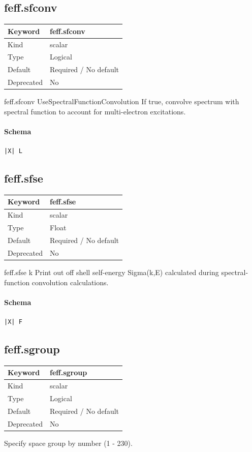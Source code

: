 \documentclass[11pt]{article}
\begin{document}
{{{{\subsection{feff.sfconv}
\label{kw:feff-sfconv}
\begin{longtable}{|p{1.5in}|p{4.5in}|}
\hline
Keyword & feff.sfconv \\
\hline
Kind & scalar \\
\hline
Type & Logical \\
\hline
Default & Required / No default \\
\hline
Deprecated & No \\
\hline
\end{longtable}
 feff.sfconv{ UseSpectralFunctionConvolution }
 If true, convolve spectrum with spectral function to account for
 multi-electron excitations.

\paragraph{Schema}
\begin{Verbatim}
|X| L
\end{Verbatim}

\subsection{feff.sfse}
\label{kw:feff-sfse}
\begin{longtable}{|p{1.5in}|p{4.5in}|}
\hline
Keyword & feff.sfse \\
\hline
Kind & scalar \\
\hline
Type & Float \\
\hline
Default & Required / No default \\
\hline
Deprecated & No \\
\hline
\end{longtable}
 feff.sfse{ k }
 Print out off shell self-energy Sigma(k,E) calculated during
 spectral-function convolution calculations.

\paragraph{Schema}
\begin{Verbatim}
|X| F
\end{Verbatim}

\subsection{feff.sgroup}
\label{kw:feff-sgroup}
\begin{longtable}{|p{1.5in}|p{4.5in}|}
\hline
Keyword & feff.sgroup \\
\hline
Kind & scalar \\
\hline
Type & Logical \\
\hline
Default & Required / No default \\
\hline
Deprecated & No \\
\hline
\end{longtable}
 Specify space group by number (1 - 230).

}}}}
\end{document}
